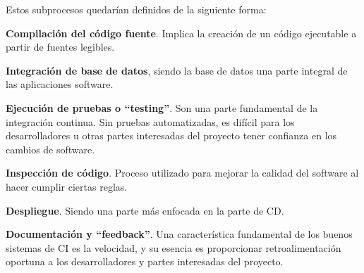 Estos subprocesos quedarían definidos de la siguiente forma:
\begin{compactitem}
    \item \textbf{Compilación del código fuente}. Implica la creación de un código ejecutable a partir de fuentes legibles.
    \item \textbf{Integración de base de datos}, siendo la base de datos una parte integral de las aplicaciones software.
    \item \textbf{Ejecución de pruebas o “testing”}. Son una parte fundamental de la integración continua. Sin pruebas automatizadas, es difícil para los desarrolladores u otras partes interesadas del proyecto tener confianza en los cambios de software.
    \item \textbf{Inspección de código}. Proceso utilizado para mejorar la calidad del software al hacer cumplir ciertas reglas.
    \item \textbf{Despliegue}. Siendo una parte más enfocada en la parte de CD.
    \item \textbf{Documentación y “feedback”}. Una característica fundamental de los buenos sistemas de CI es la velocidad, y su esencia es proporcionar retroalimentación oportuna a los desarrolladores y partes interesadas del proyecto.
\end{compactitem}




